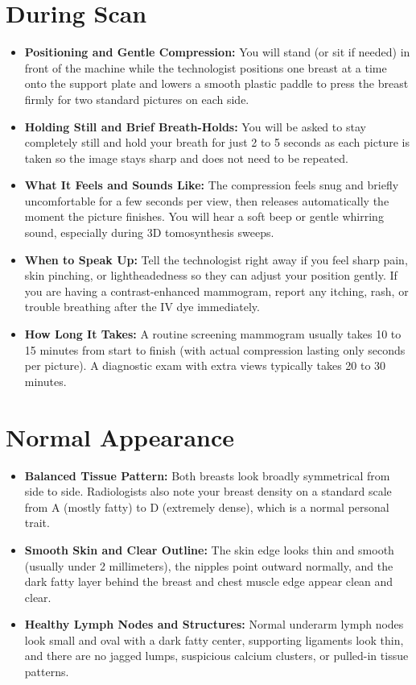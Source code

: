 \section{During Scan}

\begin{itemize}
    \item \textbf{Positioning and Gentle Compression:} You will stand (or sit if needed) in front of the machine while the technologist positions one breast at a time onto the support plate and lowers a smooth plastic paddle to press the breast firmly for two standard pictures on each side.
    \item \textbf{Holding Still and Brief Breath-Holds:} You will be asked to stay completely still and hold your breath for just 2 to 5 seconds as each picture is taken so the image stays sharp and does not need to be repeated.
    \item \textbf{What It Feels and Sounds Like:} The compression feels snug and briefly uncomfortable for a few seconds per view, then releases automatically the moment the picture finishes. You will hear a soft beep or gentle whirring sound, especially during 3D tomosynthesis sweeps.
    \item \textbf{When to Speak Up:} Tell the technologist right away if you feel sharp pain, skin pinching, or lightheadedness so they can adjust your position gently. If you are having a contrast-enhanced mammogram, report any itching, rash, or trouble breathing after the IV dye immediately.
    \item \textbf{How Long It Takes:} A routine screening mammogram usually takes 10 to 15 minutes from start to finish (with actual compression lasting only seconds per picture). A diagnostic exam with extra views typically takes 20 to 30 minutes.
\end{itemize}

\section{Normal Appearance}

\begin{itemize}
    \item \textbf{Balanced Tissue Pattern:} Both breasts look broadly symmetrical from side to side. Radiologists also note your breast density on a standard scale from A (mostly fatty) to D (extremely dense), which is a normal personal trait.
    \item \textbf{Smooth Skin and Clear Outline:} The skin edge looks thin and smooth (usually under 2 millimeters), the nipples point outward normally, and the dark fatty layer behind the breast and chest muscle edge appear clean and clear.
    \item \textbf{Healthy Lymph Nodes and Structures:} Normal underarm lymph nodes look small and oval with a dark fatty center, supporting ligaments look thin, and there are no jagged lumps, suspicious calcium clusters, or pulled-in tissue patterns.
\end{itemize}

